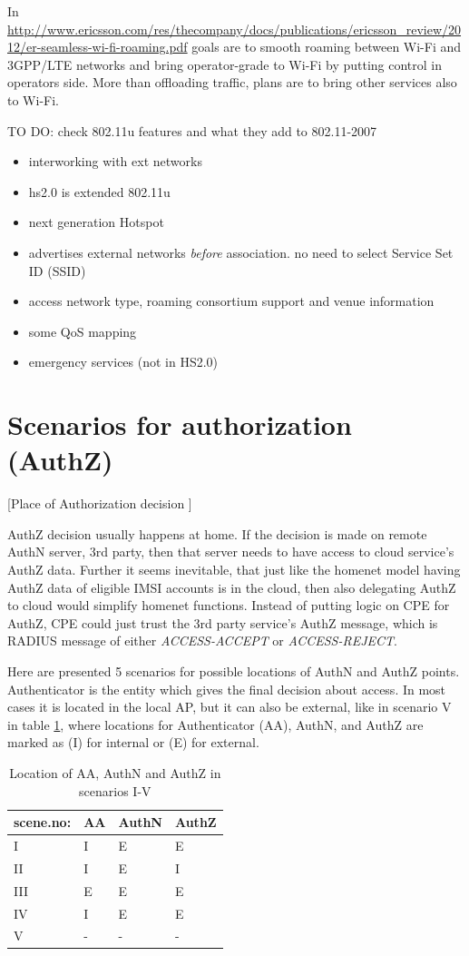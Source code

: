 \documentclass[12pt,a4paper,english]{tutthesis}
\begin{document}
In 
\url{http://www.ericsson.com/res/thecompany/docs/publications/ericsson_review/2012/er-seamless-wi-fi-roaming.pdf}
goals are to smooth roaming between Wi-Fi and 3GPP/LTE networks
and bring operator-grade to Wi-Fi by putting control in operators side. More
than offloading traffic, plans are to bring other services also to Wi-Fi.

TO DO: check 802.11u features and what they add to 802.11-2007
\begin{itemize}
\item interworking with ext networks
\item hs2.0 is extended 802.11u
\item next generation Hotspot
\item advertises external networks \emph{before} association. no need to
select Service Set ID (SSID)
\item access network type, roaming consortium support and venue information
\item some QoS mapping
\item emergency services (not in HS2.0)
\end{itemize}


\section{Scenarios for authorization (AuthZ)}
\label{sec-4-5}

[Place of Authorization decision  ]

AuthZ decision usually happens at home.
If the decision is made on remote AuthN server, 3rd party, 
then that server needs to have access to 
cloud service's AuthZ data. 
Further it seems inevitable, that just like the homenet model
having AuthZ data of eligible IMSI accounts is in the cloud, 
then also delegating AuthZ to cloud would simplify homenet
functions. Instead of putting logic on CPE for AuthZ, CPE
could just trust the 3rd party service's AuthZ message, which is 
RADIUS message of either \emph{ACCESS-ACCEPT} or \emph{ACCESS-REJECT}.


Here are presented 5 scenarios for possible locations of AuthN and 
AuthZ points. Authenticator is the entity which gives the final decision 
about access. In most cases it is located in the
local AP, but it can also be external, like in scenario V in 
table \ref{table-scenarios}, where locations for Authenticator (AA),
AuthN, and AuthZ are marked as (I) for internal or (E) for external.

\begin{table}[htb]
\caption{\label{table-scenarios}Location of AA, AuthN and AuthZ in scenarios I-V}
\centering
\begin{tabular}{llll}
scene.no: & AA & AuthN & AuthZ\\
\hline
I & I & E & E\\
II & I & E & I\\
III & E & E & E\\
IV & I & E & E\footnotemark\\
V & - & - & -\\
\end{tabular}
\end{table}
\end{document}
